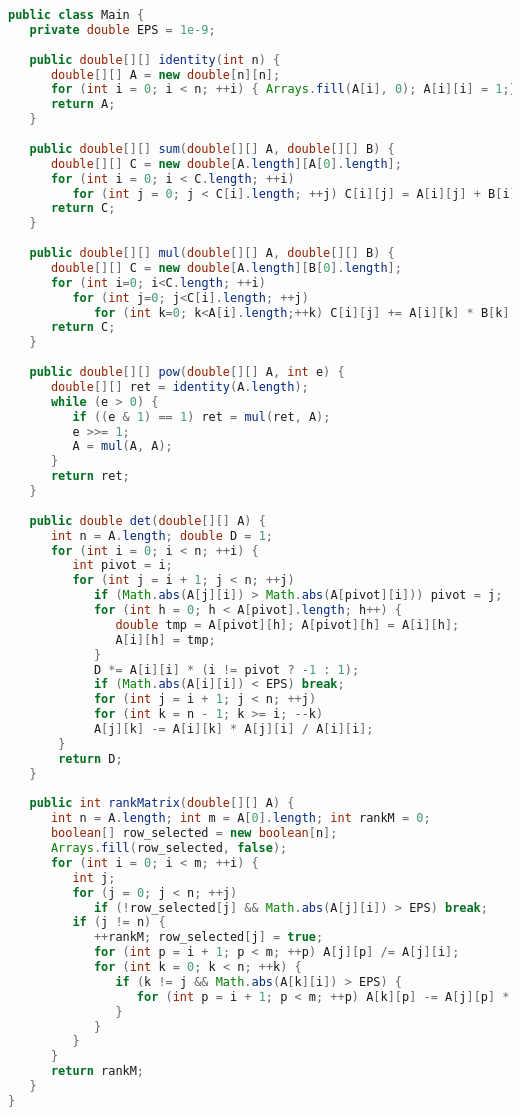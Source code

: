 \begin{lstlisting}[language=Java]
public class Main {
   private double EPS = 1e-9;
	
   public double[][] identity(int n) {
      double[][] A = new double[n][n];
      for (int i = 0; i < n; ++i) { Arrays.fill(A[i], 0); A[i][i] = 1;}
      return A;
   }
	
   public double[][] sum(double[][] A, double[][] B) {
      double[][] C = new double[A.length][A[0].length];
      for (int i = 0; i < C.length; ++i)
         for (int j = 0; j < C[i].length; ++j) C[i][j] = A[i][j] + B[i][j];
      return C;
   }
	
   public double[][] mul(double[][] A, double[][] B) {
      double[][] C = new double[A.length][B[0].length];
      for (int i=0; i<C.length; ++i)
         for (int j=0; j<C[i].length; ++j)
            for (int k=0; k<A[i].length;++k) C[i][j] += A[i][k] * B[k][j];
      return C;
   }
	
   public double[][] pow(double[][] A, int e) {
      double[][] ret = identity(A.length);
      while (e > 0) {
         if ((e & 1) == 1) ret = mul(ret, A);
         e >>= 1;
         A = mul(A, A);
      }
      return ret;
   }
	
   public double det(double[][] A) {
      int n = A.length; double D = 1;
      for (int i = 0; i < n; ++i) {
         int pivot = i;
         for (int j = i + 1; j < n; ++j)
            if (Math.abs(A[j][i]) > Math.abs(A[pivot][i])) pivot = j;
            for (int h = 0; h < A[pivot].length; h++) {
               double tmp = A[pivot][h]; A[pivot][h] = A[i][h];
               A[i][h] = tmp;
            }
            D *= A[i][i] * (i != pivot ? -1 : 1);
            if (Math.abs(A[i][i]) < EPS) break;
            for (int j = i + 1; j < n; ++j)
            for (int k = n - 1; k >= i; --k)
            A[j][k] -= A[i][k] * A[j][i] / A[i][i];
       }
       return D;
   }
	
   public int rankMatrix(double[][] A) {
      int n = A.length; int m = A[0].length; int rankM = 0;
      boolean[] row_selected = new boolean[n];
      Arrays.fill(row_selected, false);
      for (int i = 0; i < m; ++i) {
         int j;
         for (j = 0; j < n; ++j)
            if (!row_selected[j] && Math.abs(A[j][i]) > EPS) break;
         if (j != n) {
            ++rankM; row_selected[j] = true;
            for (int p = i + 1; p < m; ++p) A[j][p] /= A[j][i];
            for (int k = 0; k < n; ++k) {
               if (k != j && Math.abs(A[k][i]) > EPS) {
                  for (int p = i + 1; p < m; ++p) A[k][p] -= A[j][p] * A[k][i];
               }
            }
         }
      }
      return rankM;
   }
}
\end{lstlisting}